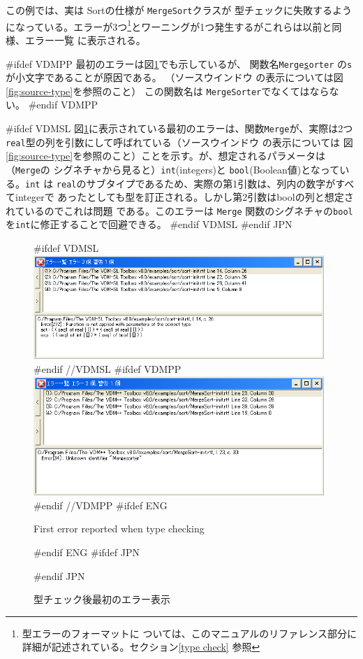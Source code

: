 \documentclass[\pformat,12pt]{article}
\newcommand{\guicmd}[1]{{\sf #1}}
\newcommand{\guicmd}[1]{{\gt #1}}
\begin{document}
この例では、実は
{
Sortの仕様が
}
{
{\tt MergeSort}クラスが
}
型チェックに失敗するようになっている。エラーが3つ\footnote{型エラーのフォーマットに
ついては、このマニュアルのリファレンス部分に詳細が記述されている。セクション\ref{type check}
参照 }とワーニングが1つ発生するがこれらは以前と同様、\guicmd{エラー一覧} に表示される。

#ifdef VDMPP
最初のエラーは図\ref{fig:type_error1}でも示しているが、
関数名{\tt Merge\underline{s}orter} の{\tt s}が小文字であることが原因である。
（\guicmd{ソースウインドウ} の表示については図\ref{fig:source-type}を参照のこと）
この関数名は {\tt MergeSorter}でなくてはならない。
#endif VDMPP

#ifdef VDMSL 
図\ref{fig:type_error1}に表示されている最初のエラーは、関数{\tt Merge}が、実際は2つ
{\tt real}型の列を引数にして呼ばれている（\guicmd{ソースウインドウ} の表示については
図\ref{fig:source-type}を参照のこと）ことを示す。が、想定されるパラメータは（{\tt Merge}の
シグネチャから見ると）{\tt int}(integers)と {\tt bool}(Boolean値)となっている。{\tt int} は
{\tt real}のサブタイプであるため、実際の第1引数は、列内の数字がすべてintegerで
あったとしても型を訂正される。しかし第2引数はboolの列と想定されているのでこれは問題
である。このエラーは {\tt Merge} 関数のシグネチャの{\tt bool} を{\tt int}に修正することで回避できる。
#endif VDMSL
#endif JPN

\begin{figure}[tbh]
\begin{center}
#ifdef VDMSL
\includegraphics[width=11cm]{typeError1-sl.png}
#endif //VDMSL
#ifdef VDMPP
\includegraphics[width=11cm]{typeError1-pp.png}
#endif //VDMPP
#ifdef ENG
\caption{First error reported when type checking}
#endif ENG
#ifdef JPN
\caption{型チェック後最初のエラー表示}
#endif JPN
\label{fig:type_error1}
\end{center}
\end{figure}
\end{document}
